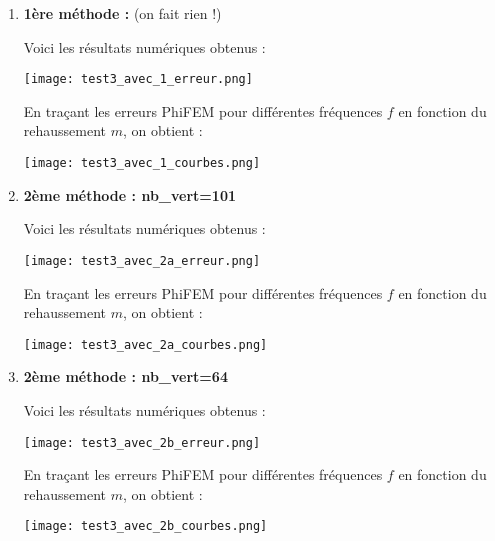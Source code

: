 \begin{enumerate}[label=\textbullet]
	\item \textbf{1ère méthode :} (on fait rien !)
	
	Voici les résultats numériques obtenus :
	
	\begin{minipage}{\linewidth}
		\centering
		\texttt{[image: test3\_avec\_1\_erreur.png]}
	\end{minipage}
	
	En traçant les erreurs PhiFEM pour différentes fréquences $f$ en fonction du rehaussement $m$, on obtient :
	
	\begin{minipage}{\linewidth}
		\centering
		\texttt{[image: test3\_avec\_1\_courbes.png]}
	\end{minipage}
	
	\item \textbf{2ème méthode : nb\_vert=101}
	
	Voici les résultats numériques obtenus :
	
	\begin{minipage}{\linewidth}
		\centering
		\texttt{[image: test3\_avec\_2a\_erreur.png]}
	\end{minipage}
	
	En traçant les erreurs PhiFEM pour différentes fréquences $f$ en fonction du rehaussement $m$, on obtient :
	
	\begin{minipage}{\linewidth}
		\centering
		\texttt{[image: test3\_avec\_2a\_courbes.png]}
	\end{minipage}
	
	\item \textbf{2ème méthode : nb\_vert=64}
	
	Voici les résultats numériques obtenus :
	
	\begin{minipage}{\linewidth}
		\centering
		\texttt{[image: test3\_avec\_2b\_erreur.png]}
	\end{minipage}
	
	En traçant les erreurs PhiFEM pour différentes fréquences $f$ en fonction du rehaussement $m$, on obtient :
	
	\begin{minipage}{\linewidth}
		\centering
		\texttt{[image: test3\_avec\_2b\_courbes.png]}
	\end{minipage}
	
\end{enumerate}

